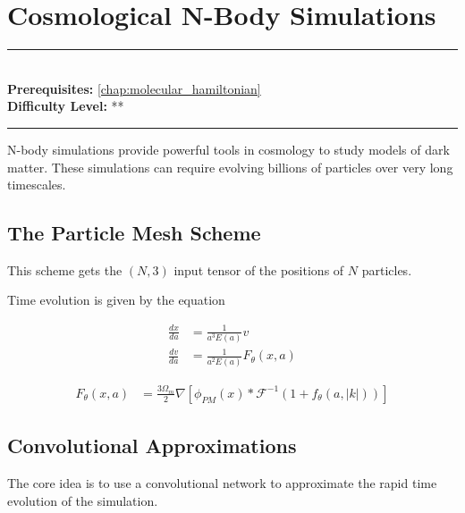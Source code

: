 \documentclass[book.tex]{subfiles}
\begin{document}
\chapter{Cosmological N-Body Simulations}
\label{chap:n_body}
\noindent\rule{11cm}{0.4pt} \\
\textbf{Prerequisites:} \autoref{chap:molecular_hamiltonian} \\
\textbf{Difficulty Level:} ** \\
\noindent\rule{11cm}{0.4pt}
\vspace{5mm}

N-body simulations provide powerful tools in cosmology to study models of dark matter. These simulations can require evolving billions of particles over very long timescales.

\section{The Particle Mesh Scheme}

This scheme gets the $(N, 3)$ input tensor of the positions of $N$ particles. 

Time evolution is given by the equation

\begin{align}
\frac{dx}{da} &= \frac{1}{a^3 E(a)} v \\
\frac{dv}{da} &= \frac{1}{a^2 E(a)}  F_\theta(x, a) 
\end{align}

\begin{align}
F_\theta(x, a) &= \frac{3 \Omega_m}{2} \nabla \left [ \phi_{PM}(x) * \mathcal{F}^{-1}(1+f_\theta(a, |k|)) \right ]
\end{align}

\section{Convolutional Approximations}

The core idea is to use a convolutional network to approximate the rapid time evolution of the simulation.
\end{document}
